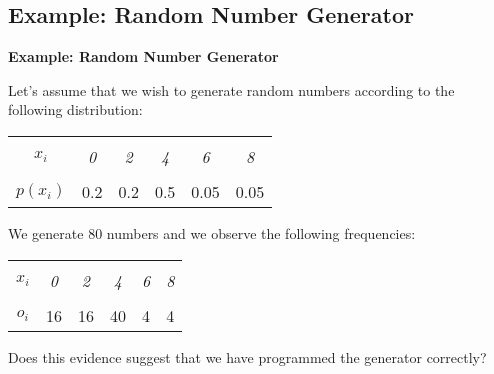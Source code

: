 \documentclass[compress]{beamer}        %
\makeatletter
\newcommand{\tcb}{\textcolor{beamer@blendedblue}}
\makeatother
\begin{document}
\subsection{Example: Random Number Generator}
\begin{frame}{\bf \tcb{Example: Random Number Generator}}

Let's assume that we wish to generate random numbers according to the following distribution:

\begin{center}
\begin{tabular}{|c|ccccc|}
\hline
&&&&&\\[-0.3cm]
$x_i$      & \emph{0} & \emph{2} & \emph{4} & \emph{6} & \emph{8} \\[0.1cm]
\hline
&&&&&\\[-0.3cm]
$p(x_i)$ & 0.2 & 0.2 & 0.5 & 0.05 & 0.05 \\[0.1cm]
\hline
\end{tabular}
\end{center}

We generate 80 numbers and we observe the following frequencies:
\begin{center}
\begin{tabular}{|c|ccccc|}
\hline
&&&&&\\[-0.3cm]
$x_i$      & \emph{0} & \emph{2} & \emph{4} & \emph{6} & \emph{8} \\[0.1cm]
\hline
&&&&&\\[-0.3cm]
$o_i$ & 16 & 16 & 40 & 4 & 4 \\[0.1cm]
\hline
\end{tabular}
\end{center}
Does this evidence suggest that we have programmed the generator correctly?


\end{frame}
\end{document}
